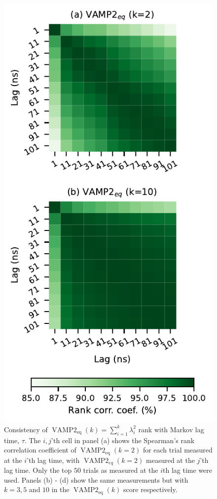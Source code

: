 \documentclass[journal=jacsat,manuscript=article]{achemso}
\begin{document}
\begin{figure}
    \centering
    \includegraphics{figures/vampeq_rank_vs_lag.pdf}
    \caption{Consistency of $\operatorname{VAMP2}_{\mathrm{eq}}(k)=\sum_{i=1}^{k}\lambda_{i}^{2}$ rank with Markov lag time, $\tau$. The $i, j$'th cell in panel (a) shows the Spearman's rank correlation coefficient of $\operatorname{VAMP2}_{\mathrm{eq}}(k=2)$ for each trial measured at the $i$'th lag time, with   $\operatorname{VAMP2}_{eq}(k=2)$  measured at the $j$'th lag time.  Only the top $50$ trials as measured at the $i$th lag time were used.  Panels (b) - (d) show the same measurements but with $k=3, 5$ and $10$  in the $\operatorname{VAMP2}_{\mathrm{eq}}(k)$ score respectively. }
    \label{fig:vamp_rank_vs_lag}
\end{figure}
\end{document}
